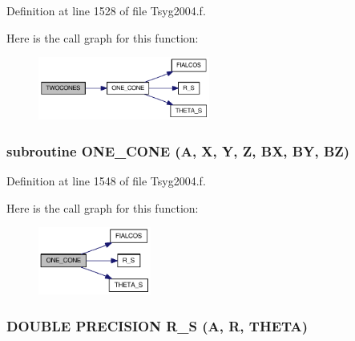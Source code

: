 Definition at line 1528 of file Tsyg2004.f.

Here is the call graph for this function:\nopagebreak
\begin{figure}[H]
\begin{center}
\leavevmode
\includegraphics[width=160pt]{_tsyg2004_8f_da6b1a3dc7523ce7bc09c55324951441_cgraph}
\end{center}
\end{figure}
\hypertarget{_tsyg2004_8f_ab281013369e2f232027ff169264fd07}{
\subsubsection[{ONE\_\-CONE}]{\setlength{\rightskip}{0pt plus 5cm}subroutine ONE\_\-CONE (A, \/  X, \/  Y, \/  Z, \/  BX, \/  BY, \/  BZ)}}
\label{_tsyg2004_8f_ab281013369e2f232027ff169264fd07}




Definition at line 1548 of file Tsyg2004.f.

Here is the call graph for this function:\nopagebreak
\begin{figure}[H]
\begin{center}
\leavevmode
\includegraphics[width=105pt]{_tsyg2004_8f_ab281013369e2f232027ff169264fd07_cgraph}
\end{center}
\end{figure}
\hypertarget{_tsyg2004_8f_a821422093810532210ff6f1aec0920d}{
\subsubsection[{R\_\-S}]{\setlength{\rightskip}{0pt plus 5cm}DOUBLE PRECISION R\_\-S (A, \/  R, \/  THETA)}}
\label{_tsyg2004_8f_a821422093810532210ff6f1aec0920d}




